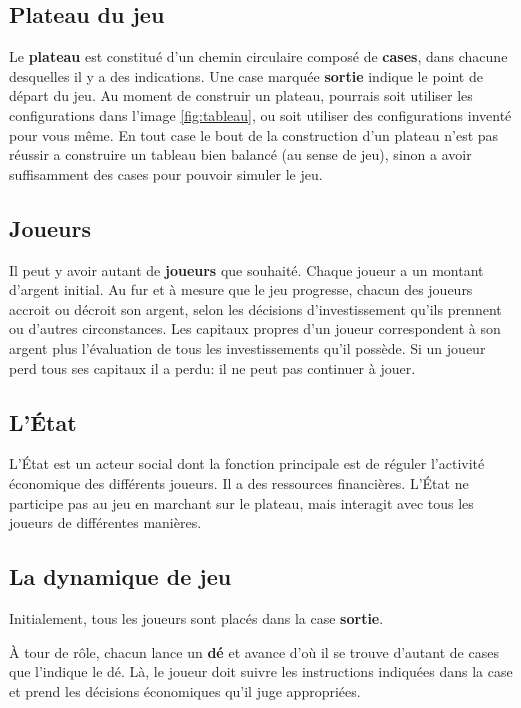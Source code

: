\documentclass[12pt]{article}
\begin{document}
    \subsection{Plateau du jeu}
    Le \textbf{plateau} est constitué d'un chemin circulaire composé de \textbf{cases},
dans chacune desquelles il y a des indications. Une case marquée \textbf{sortie}
indique le point de départ du jeu.
	Au moment de construir un plateau, pourrais soit utiliser les configurations dans l'image \autoref{fig:tableau}, ou soit utiliser des configurations inventé pour vous même. 
	En tout case le bout de la construction d'un plateau n'est pas réussir a construire un tableau bien balancé (au sense de jeu), sinon a avoir suffisamment des cases pour pouvoir simuler le jeu.
	
    \subsection{Joueurs}
   
    Il peut y avoir autant de \textbf{joueurs} que souhaité. Chaque joueur a un
montant d'argent initial. Au fur et à mesure que le jeu progresse, chacun des joueurs accroit
ou décroit son argent, selon les décisions d'investissement qu'ils prennent ou d'autres
circonstances. Les capitaux propres d'un joueur correspondent à
son argent plus l'évaluation de tous les investissements qu'il possède.
Si un joueur perd tous ses capitaux il a perdu: il ne peut pas continuer à jouer.
    
    \subsection{L'\'Etat}
    L'\'Etat est un acteur social dont la fonction principale est de réguler l'activité économique des
différents joueurs. Il a des ressources financières. L'État ne participe pas
au jeu en marchant sur le plateau, mais interagit avec tous les joueurs de différentes manières.


    \subsection{La dynamique de jeu}
    Initialement, tous les joueurs sont placés dans la case \textbf{sortie}. 
    
    À tour de rôle, chacun lance
un \textbf{dé} et avance d'où il se trouve d'autant de cases que l'indique le dé. 
    Là, le joueur doit suivre les instructions indiquées dans la case et prend les décisions économiques qu'il juge appropriées.
    
\end{document}
